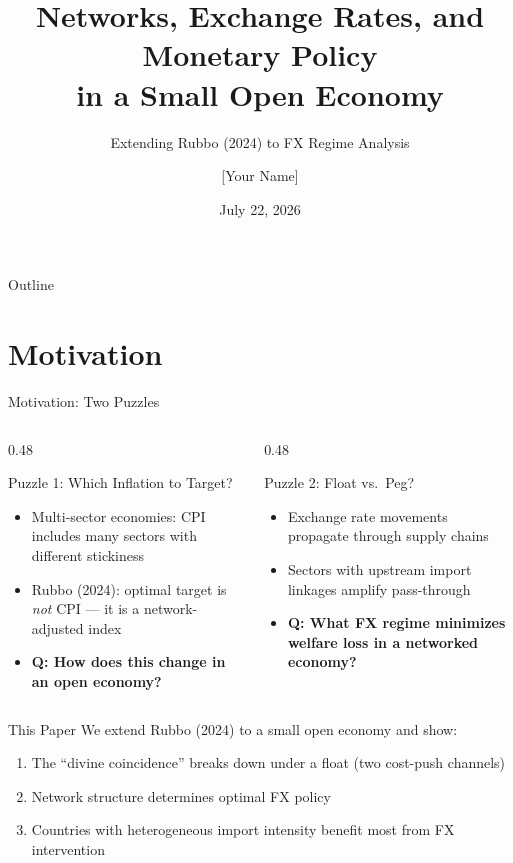 \documentclass[aspectratio=169]{beamer}
\title[Networks, FX Policy, SOE]{Networks, Exchange Rates, and Monetary Policy\\
in a Small Open Economy}
\subtitle{Extending Rubbo (2024) to FX Regime Analysis}
\author{[Your Name]}
\institute{[Your Institution]}
\date{July 22, 2026}
\begin{document}
\begin{frame}
\titlepage
\end{frame}

\begin{frame}{Outline}
\tableofcontents
\end{frame}

\section{Motivation}

\begin{frame}{Motivation: Two Puzzles}
\begin{columns}
\begin{column}{0.48\textwidth}
\begin{block}{Puzzle 1: Which Inflation to Target?}
\begin{itemize}
    \item Multi-sector economies: CPI includes many sectors with different stickiness
    \item Rubbo (2024): optimal target is \textit{not} CPI --- it is a network-adjusted index
    \item \textbf{Q: How does this change in an open economy?}
\end{itemize}
\end{block}
\end{column}
\begin{column}{0.48\textwidth}
\begin{block}{Puzzle 2: Float vs.\ Peg?}
\begin{itemize}
    \item Exchange rate movements propagate through supply chains
    \item Sectors with upstream import linkages amplify pass-through
    \item \textbf{Q: What FX regime minimizes welfare loss in a networked economy?}
\end{itemize}
\end{block}
\end{column}
\end{columns}

\vspace{0.4cm}
\begin{alertblock}{This Paper}
We extend Rubbo (2024) to a small open economy and show:
\begin{enumerate}
    \item The ``divine coincidence'' breaks down under a float (two cost-push channels)
    \item Network structure determines optimal FX policy
    \item Countries with heterogeneous import intensity benefit most from FX intervention
\end{enumerate}
\end{alertblock}
\end{frame}
\end{document}
